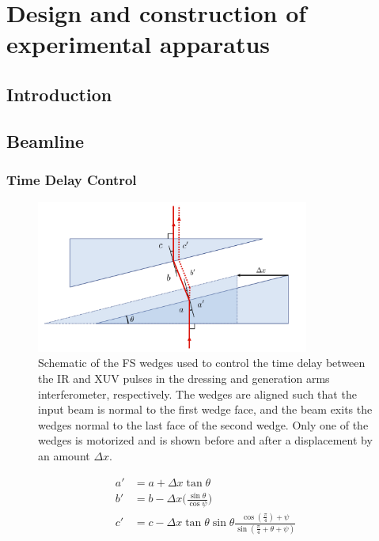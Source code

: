 \chapter{Design and construction of experimental apparatus}
\label{beamline}

\section{Introduction}
\label{intro_beamline}


\section{Beamline}
\label{sec:full_beamline}

\subsection{Time Delay Control}
\label{sec:delay_wedges}

\begin{figure}
	\centering
	\includegraphics[width=0.8\textwidth]{figures/Beamline/wedge_calibration.pdf}
	\caption{Schematic of the FS wedges used to control the time delay between the IR and XUV pulses in the dressing and generation arms interferometer, respectively. The wedges are aligned such that the input beam is normal to the first wedge face, and the beam exits the wedges normal to the last face of the second wedge.  Only one of the wedges is motorized and is shown before and after a displacement by an amount $\Delta x$.}
	\label{fig:wedges}
\end{figure}


\begin{align}
	a'&=a+\Delta x \tan\theta\\
	b'&=b-\Delta x \bigg(\frac{\sin\theta}{\cos\psi}\bigg)\\
	c'&=c-\Delta x \tan\theta\sin\theta\frac{\cos(\frac{\pi}{4})+\psi}{\sin(\frac{\pi}{4}+\theta+\psi)}
\end{align}


